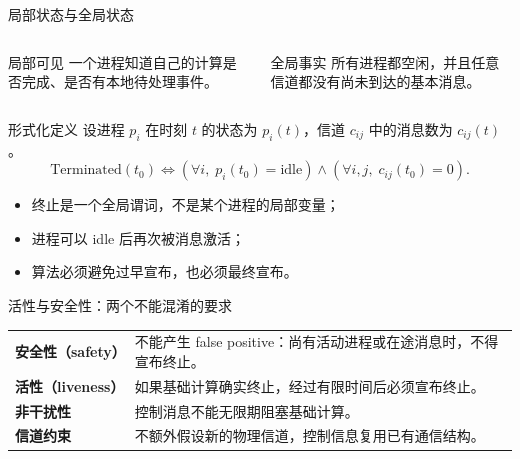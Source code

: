 \documentclass[UTF8,fontset=none,aspectratio=169,10pt]{beamer}
\begin{document}
\begin{frame}{局部状态与全局状态}
\begin{columns}[T]
\begin{block}{局部可见}
一个进程知道自己的计算是否完成、是否有本地待处理事件。
\end{block}
\begin{block}{全局事实}
所有进程都空闲，并且任意信道都没有尚未到达的基本消息。
\end{block}
\vfill
{}
\end{columns}
\end{frame}

\begin{frame}{形式化定义}
设进程 $p_i$ 在时刻 $t$ 的状态为 $p_i(t)$，信道 $c_{ij}$ 中的消息数为 $c_{ij}(t)$。
\[
\text{Terminated}(t_0)\iff
\left(\forall i,\;p_i(t_0)=\text{idle}\right)
\land
\left(\forall i,j,\;c_{ij}(t_0)=0\right).
\]
\vfill
\begin{itemize}
  \item 终止是一个全局谓词，不是某个进程的局部变量；
  \item 进程可以 idle 后再次被消息激活；
  \item 算法必须避免过早宣布，也必须最终宣布。
\end{itemize}
\end{frame}

\begin{frame}{活性与安全性：两个不能混淆的要求}
\begin{tabularx}{\linewidth}{>{\bfseries}p{2.8cm}X}
\toprule
安全性（safety） & 不能产生 false positive：尚有活动进程或在途消息时，不得宣布终止。 \\
活性（liveness） & 如果基础计算确实终止，经过有限时间后必须宣布终止。 \\
非干扰性 & 控制消息不能无限期阻塞基础计算。 \\
信道约束 & 不额外假设新的物理信道，控制信息复用已有通信结构。 \\
\bottomrule
\end{tabularx}
\vfill
{}
\end{frame}
\end{document}
